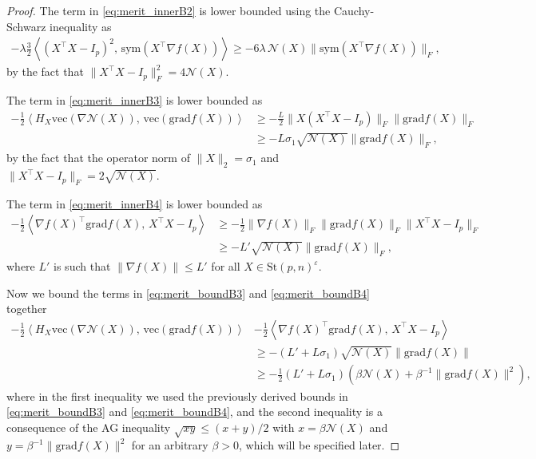 \documentclass[twoside,11pt]{article}
\newcommand{\grad}{{\mathrm{grad}}}
\newcommand{\stiefel}{{\mathrm{St}(p, n)}}
\newcommand{\sym}{{\mathrm{sym}}}
\newcommand{\vect}[1]{\mathrm{vec}\left(#1\right)}
\newcommand{\cN}{\mathcal{N}} %
\newcommand{\vectHess}[1]{H_{#1}} %
\newcommand{\nfX}{\nabla f(X)} %
\newcommand{\inner}[2]{\left\langle#1,\,#2\right\rangle} %
\newcommand{\Lc}{L} %
\newcommand{\gradc}{L'} %
\begin{document}
\begin{proof}
    The term in \eqref{eq:merit_innerB2} is lower bounded using the Cauchy-Schwarz inequality as
    \begin{align}
        - \lambda \frac32 \inner{(X^{\top}X-I_p)^2}{\sym(X^\top \nabla f(X))} \geq - 6 \lambda \, \cN(X) \| \sym(X^\top \nabla f(X)) \|_F , \label{eq:merit_boundB2}
    \end{align}
    by the fact that $\|X^\top X - I_p\|^2_F = 4\cN(X)$.
    
    The term in \eqref{eq:merit_innerB3} is lower bounded as
    \begin{align}
         -\frac12\inner{\vectHess{X} \vect{ \nabla \cN(X)}}{\vect{\grad f(X)}} &\geq -\frac{\Lc}{2} \|  X (X^\top X - I_p) \|_F \|\grad f(X)\|_F \\ 
         & \geq -\Lc \sigma_1 \sqrt{\cN(X)} \|\grad f(X)\|_F, \label{eq:merit_boundB3}
    \end{align} 
    by the fact that the operator norm of $\|X\|_2 = \sigma_1 $ and $\| X^\top X - I_p\|_F = 2\sqrt{\cN(X)}$.
    
    The term in \eqref{eq:merit_innerB4} is lower bounded as
    \begin{align}
        -\frac12\inner{\nfX^{\top} \grad f(X)}{X^{\top}X - I_p} & \geq -\frac12\|\nabla f(X)\|_F \| \grad f(X) \|_F \| X^\top X - I_p \|_F\\
        &\geq - \gradc \sqrt{\cN(X)} \|\grad f(X)\|_F,\label{eq:merit_boundB4}
    \end{align}
    where $\gradc$ is such that $\|\nabla f(X)\| \leq \gradc$ for all $X\in\stiefel^\varepsilon$. 
    
    
    Now we bound the terms in \eqref{eq:merit_boundB3} and \eqref{eq:merit_boundB4} together
    \begin{align}
         -\frac12\inner{\vectHess{X} \vect{ \nabla \cN(X)}}{\vect{\grad f(X)}}  &-\frac12\inner{\nfX^{\top} \grad f(X)}{X^{\top}X - I_p} \nonumber\\
         & \geq - (\gradc + \Lc\sigma_1)  \sqrt{\cN(X)} \| \grad f(X) \|  \\ 
         & \geq - \frac12 (\gradc + \Lc\sigma_1) \left( \beta \cN(X) + \beta^{-1} \| \grad f(X)\|^2 \right)    \label{eq:merit_boundB3and4},
    \end{align}
    where in the first inequality we used the previously derived bounds in \eqref{eq:merit_boundB3} and \eqref{eq:merit_boundB4}, and the second inequality is a consequence of the AG inequality $\sqrt{xy}\leq (x+y)/2$ with $x = \beta \cN(X)$ and $y = \beta^{-1} \| \grad f(X)\|^2$ for an arbitrary $\beta >0$, which will be specified later.
    

\end{proof}
\end{document}
